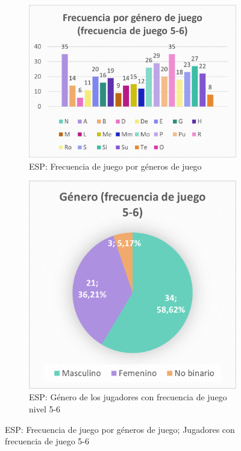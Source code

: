 \documentclass[12pt, a4paper,twoside,titlepage]{book}
\begin{document}
\begin{figure}
\centering
\begin{subfigure}{.6\textwidth}
  \centering
  \includegraphics[width=.95\linewidth]{ANEXO ESP/5AnexESPgen56}
  \caption{ESP: Frecuencia de juego por géneros de juego}
\end{subfigure}%
\begin{subfigure}{.4\textwidth}
  \centering
  \includegraphics[width=.95\linewidth]{ANEXO ESP/6AnexESPgen56}
  \caption{ESP: Género de los jugadores con frecuencia de juego nivel 5-6}
\end{subfigure}
\caption{ESP: Frecuencia de juego por géneros de juego; Jugadores con frecuencia de juego 5-6}
\label{fig:ESPFrecgen56}
\end{figure}
\end{document}
